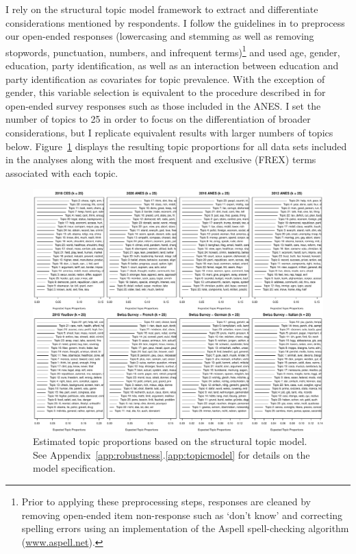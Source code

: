 I rely on the structural topic model framework to extract and differentiate considerations mentioned by respondents. I follow the guidelines in \citet{roberts2014structural} to preprocess our open-ended responses (lowercasing and stemming as well as removing stopwords, punctuation, numbers, and infrequent terms)\footnote{Prior to applying these preprocessing steps, responses are cleaned by removing open-ended item non-response such as `don't know' and correcting spelling errors using an implementation of the Aspell spell-checking algorithm (\url{www.aspell.net}).} and used age, gender, education, party identification, as well as an interaction between education and party identification as covariates for topic prevalence. With the exception of gender, this variable selection is equivalent to the procedure described in \citet{roberts2014structural} for open-ended survey responses such as those included in the ANES. I set the number of topics to 25 in order to focus on the differentiation of broader considerations, but I replicate equivalent results with larger numbers of topics below. Figure~\ref{fig:stm_prop} displays the resulting topic proportions for all data sets included in the analyses along with the most frequent and exclusive (FREX) terms associated with each topic.

\begin{figure}[h]\centering
\includegraphics[width=.89\textwidth]{../fig/stm_prop.pdf}
\caption[Estimated topic proportions based on the structural topic model]{Estimated topic proportions based on the structural topic model. See Appendix~\ref{app:robustness}.\ref{app:topicmodel} for details on the model specification.}\label{fig:stm_prop}
\end{figure}


